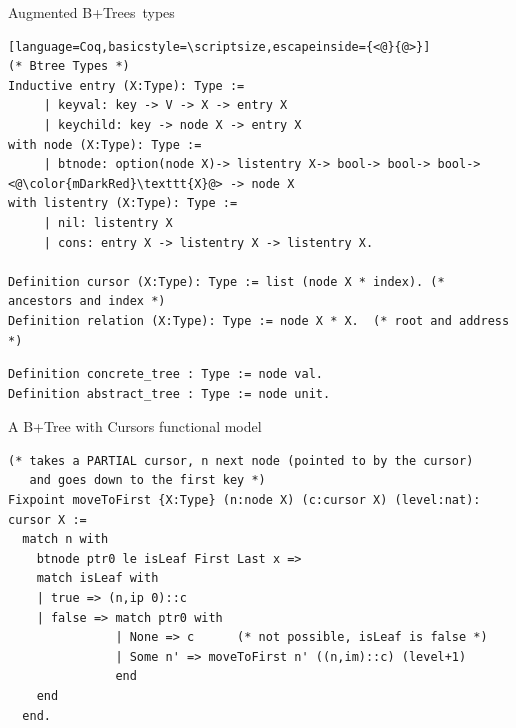 \documentclass[page number,usenames,dvipsnames]{beamer}
\def\btrees{B+Trees}
\begin{document}
\begin{frame}[fragile]{Augmented \btrees\ types}

  \begin{lstlisting}[language=Coq,basicstyle=\scriptsize,escapeinside={<@}{@>}]
(* Btree Types *)
Inductive entry (X:Type): Type :=
     | keyval: key -> V -> X -> entry X
     | keychild: key -> node X -> entry X
with node (X:Type): Type :=
     | btnode: option(node X)-> listentry X-> bool-> bool-> bool-> <@\color{mDarkRed}\texttt{X}@> -> node X
with listentry (X:Type): Type :=
     | nil: listentry X
     | cons: entry X -> listentry X -> listentry X.

Definition cursor (X:Type): Type := list (node X * index). (* ancestors and index *)
Definition relation (X:Type): Type := node X * X.  (* root and address *)
  \end{lstlisting}
  \vfill
  \begin{lstlisting}[language=Coq]
Definition concrete_tree : Type := node val.
Definition abstract_tree : Type := node unit.
  \end{lstlisting}

  
\end{frame}

\begin{frame}[fragile]{A B+Tree with Cursors functional model}

  \begin{lstlisting}[language=Coq,basicstyle=\scriptsize]
(* takes a PARTIAL cursor, n next node (pointed to by the cursor)
   and goes down to the first key *)
Fixpoint moveToFirst {X:Type} (n:node X) (c:cursor X) (level:nat): cursor X :=
  match n with
    btnode ptr0 le isLeaf First Last x =>
    match isLeaf with
    | true => (n,ip 0)::c
    | false => match ptr0 with
               | None => c      (* not possible, isLeaf is false *)
               | Some n' => moveToFirst n' ((n,im)::c) (level+1)
               end
    end
  end.
\end{lstlisting}
  
\end{frame}
\end{document}
